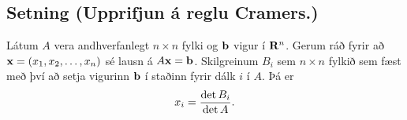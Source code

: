 \documentclass[a4paper,10pt,icelandic]{sphinxmanual}
\begin{document}
\subsection{Setning (Upprifjun á reglu Cramers.)}
\label{Kafli2:index-27}\label{Kafli2:setning-upprifjun-a-reglu-cramers}
Látum \(A\) vera andhverfanlegt \(n\times n\) fylki og
\(\mbox{${\bf b}$}\) vigur í \(\mbox{${\bf R}^n$}\). Gerum ráð
fyrir að \(\mbox{${\bf x}$}=(x_1, x_2, \ldots, x_n)\) sé lausn á
\(A\mbox{${\bf x}$}=\mbox{${\bf b}$}\). Skilgreinum \(B_i\) sem
\(n\times n\) fylkið sem fæst með því að setja vigurinn
\(\mbox{${\bf b}$}\) í staðinn fyrir dálk \(i\) í \(A\). Þá
er
\begin{gather}
\begin{split}\displaystyle x_i=\frac{\det B_i}{\det A}.\end{split}\notag
\end{gather}
\end{document}
